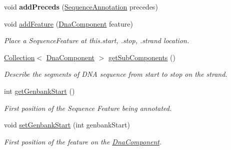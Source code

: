 \begin{DoxyCompactItemize}
\item 
\hypertarget{interfaceorg_1_1sbolstandard_1_1core_1_1_sequence_annotation_a6bba6fe4e9dafa9c08cf38805a6d6f44}{
void {\bfseries addPreceds} (\hyperlink{interfaceorg_1_1sbolstandard_1_1core_1_1_sequence_annotation}{SequenceAnnotation} precedes)}
\label{interfaceorg_1_1sbolstandard_1_1core_1_1_sequence_annotation_a6bba6fe4e9dafa9c08cf38805a6d6f44}

\item 
void \hyperlink{interfaceorg_1_1sbolstandard_1_1core_1_1_sequence_annotation_a53ab24345d94d94b913c176b85d1d09b}{addFeature} (\hyperlink{interfaceorg_1_1sbolstandard_1_1core_1_1_dna_component}{DnaComponent} feature)
\begin{DoxyCompactList}\small\item\em Place a SequenceFeature at this.start, .stop, .strand location. \item\end{DoxyCompactList}\item 
\hyperlink{interfaceorg_1_1sbolstandard_1_1core_1_1_collection}{Collection}$<$ \hyperlink{interfaceorg_1_1sbolstandard_1_1core_1_1_dna_component}{DnaComponent} $>$ \hyperlink{interfaceorg_1_1sbolstandard_1_1core_1_1_sequence_annotation_a4b96a2b94246e2eb0f4e171a4fea48e6}{getSubComponents} ()
\begin{DoxyCompactList}\small\item\em Describe the segments of DNA sequence from start to stop on the strand. \item\end{DoxyCompactList}\item 
int \hyperlink{interfaceorg_1_1sbolstandard_1_1core_1_1_sequence_annotation_aa0da0e4fe8628ea105099920343419a1}{getGenbankStart} ()
\begin{DoxyCompactList}\small\item\em First position of the Sequence Feature being annotated. \item\end{DoxyCompactList}\item 
void \hyperlink{interfaceorg_1_1sbolstandard_1_1core_1_1_sequence_annotation_a6eb8c20badac20f22a75b09e578c699b}{setGenbankStart} (int genbankStart)
\begin{DoxyCompactList}\small\item\em First position of the feature on the \hyperlink{interfaceorg_1_1sbolstandard_1_1core_1_1_dna_component}{DnaComponent}. \item\end{DoxyCompactList}\item 

\end{DoxyCompactItemize}

